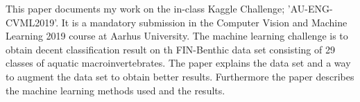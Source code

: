 This paper documents my work on the in-class Kaggle Challenge; 'AU-ENG-CVML2019'. It is a mandatory submission in the Computer Vision and Machine Learning 2019 course at Aarhus University. The machine learning challenge is to obtain decent classification result on th FIN-Benthic data set consisting of 29 classes of aquatic macroinvertebrates. The paper explains the data set and a way to augment the data set to obtain better results. Furthermore the paper describes the machine learning methods used and the results.